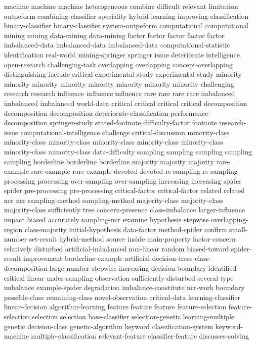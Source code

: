 machine	machine	machine	
heterogeneous	
combine	
difficult	
relevant	
limitation	
outpeform	
combining-classifier	
speciality	
hybrid-learning	
improving-classification	
binary-classifier	binary-classifier	
system-outpeform	
computational	computational	
mining	mining	
data-mining	data-mining	
factor	factor	factor	factor	factor	
imbalanced-data	imbalanced-data	imbalanced-data	
computational-statistic	
identification	
real-world	
mining-springer	
springer	
issue	
deteriorate	
intelligence	
open-research	
challenging-task	
overlapping	overlapping	
concept-overlapping	
distinguishing	
include-critical	
experimental-study	experimental-study	
minority	minority	minority	minority	minority	minority	minority	minority	
challenging	
research	research	
influence	influence	influence	
rare	rare	rare	rare	
imbalanced	imbalanced	imbalanced	
world-data	
critical	critical	critical	critical	
decomposition	decomposition	decomposition	
deteriorate-classification	
performance-decomposition	
springer-study	
stated-footnote	
difficulty-factor	
footnote	
research-issue	
computational-intelligence	
challenge	
critical-discussion	
minority-class	minority-class	minority-class	minority-class	minority-class	minority-class	minority-class	minority-class	
data-difficulty	
sampling	sampling	sampling	sampling	sampling	
borderline	borderline	borderline	
majority	majority	majority	
rare-example	rare-example	rare-example	
devoted	devoted	
re-sampling	re-sampling	
processing	processing	
over-sampling	over-sampling	
increasing	increasing	
spider	spider	
pre-processing	pre-processing	
critical-factor	critical-factor	
related	related	
ncr	ncr	
sampling-method	sampling-method	
majority-class	majority-class	majority-class	
sufficiently	
tree	
concern-presence	
class-imbalance	
larger-influence	
impact	
biased	
accurately	
sampling-ncr	
examine	
hypothesis	
stepwise	
overlapping-region	
class-majority	
initial-hypothesis	
data-factor	
method-spider	
confirm	
small-number	
set-result	
hybrid-method	
source	
inside	
main-property	
factor-concern	
relatively	
disturbed	
artificial-imbalanced	
non-linear	
random	
biased-toward	
spider-result	
improvement	
borderline-example	
artificial	
decision-trees	
class-decomposition	
large-number	
stepwise-increasing	
decision-boundary	
identified-critical	
linear	
under-sampling	
observation	
sufficiently-disturbed	
several-type	
imbalance	
example-spider	
degradation	
imbalance-constitute	
ncr-work	
boundary	
possible-class	
remaining-class	
novel-observation	
critical-data	
learning-classifier	
linear-decision	
algorithm-learning	
feature	feature	feature	
feature-selection	feature-selection	
selection	selection	
base-classifier	
selection-genetic	
learning-multiple	
genetic	
decision-class	
genetic-algorithm	
keyword	
classification-system	
keyword-machine	
multiple-classification	
relevant-feature	
classifier-feature	
discusses-solving	
